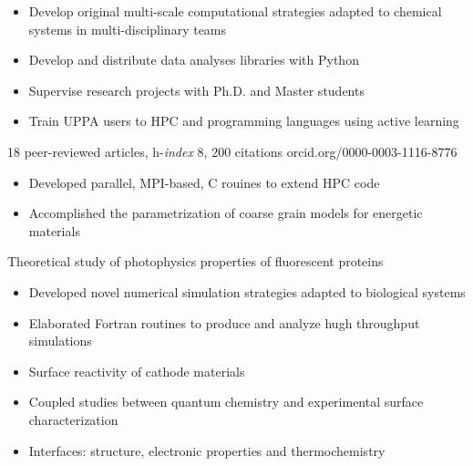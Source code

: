 \documentclass[10pt,a4paper,ragged2e]{altacv}
\begin{document}
\begin{itemize}
\item Develop original multi-scale computational strategies adapted to chemical systems in
multi-disciplinary teams
\item Develop and distribute data analyses libraries with Python
\item Supervise research projects with Ph.D. and Master students
\item Train UPPA users to HPC and programming languages using active learning
\end{itemize}
{\small 18 peer-reviewed articles, h-\textit{index} 8, 200 citations \hfill \hspace{-1ex}orcid.org/0000-0003-1116-8776}

\divider

\begin{itemize}
\item Developed parallel, MPI-based, C rouines to extend HPC code
\item Accomplished the parametrization of coarse grain models for energetic materials
\end{itemize}

\divider

Theoretical study of photophysics properties of fluorescent proteins
\smallskip
\begin{itemize}
\item Developed novel numerical simulation strategies adapted to biological systems 
\item Elaborated Fortran routines to produce and analyze hugh throughput simulations
\end{itemize}



\vspace{-1mm}
\begin{itemize}
\item Surface reactivity of cathode materials
\item Coupled studies between quantum chemistry and experimental surface characterization
\item Interfaces: structure, electronic properties and thermochemistry
\end{itemize}
\end{document}
